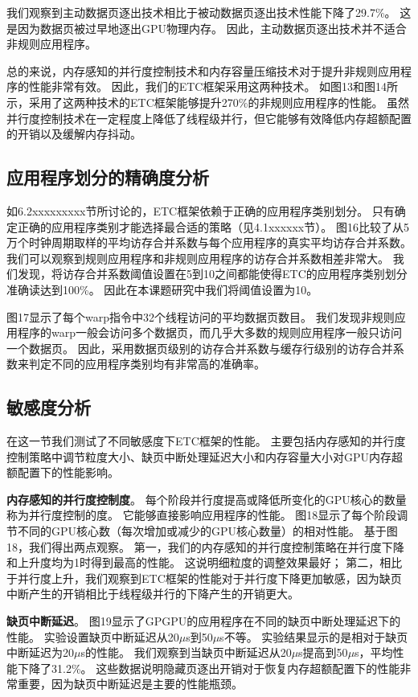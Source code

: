 我们观察到主动数据页逐出技术相比于被动数据页逐出技术性能下降了29.7\%。
这是因为数据页被过早地逐出GPU物理内存。
因此，主动数据页逐出技术并不适合非规则应用程序。

总的来说，内存感知的并行度控制技术和内存容量压缩技术对于提升非规则应用程序的性能非常有效。
因此，我们的ETC框架采用这两种技术。
如图13和图14所示，采用了这两种技术的ETC框架能够提升270\%的非规则应用程序的性能。
虽然并行度控制技术在一定程度上降低了线程级并行，但它能够有效降低内存超额配置的开销以及缓解内存抖动。

\subsection{应用程序划分的精确度分析}
如6.2xxxxxxxxx节所讨论的，ETC框架依赖于正确的应用程序类别划分。
只有确定正确的应用程序类别才能选择最合适的策略（见4.1xxxxxx节）。
图16比较了从5万个时钟周期取样的平均访存合并系数与每个应用程序的真实平均访存合并系数。
我们可以观察到规则应用程序和非规则应用程序的访存合并系数相差非常大。
我们发现，将访存合并系数阈值设置在5到10之间都能使得ETC的应用程序类别划分准确读达到100\%。
因此在本课题研究中我们将阈值设置为10。

图17显示了每个warp指令中32个线程访问的平均数据页数目。
我们发现非规则应用程序的warp一般会访问多个数据页，而几乎大多数的规则应用程序一般只访问一个数据页。
因此，采用数据页级别的访存合并系数与缓存行级别的访存合并系数来判定不同的应用程序类别均有非常高的准确率。

\subsection{敏感度分析}
在这一节我们测试了不同敏感度下ETC框架的性能。
主要包括内存感知的并行度控制策略中调节粒度大小、缺页中断处理延迟大小和内存容量大小对GPU内存超额配置下的性能影响。

\textbf{内存感知的并行度控制度}。
每个阶段并行度提高或降低所变化的GPU核心的数量称为并行度控制的度。
它能够直接影响应用程序的性能。
图18显示了每个阶段调节不同的GPU核心数（每次增加或减少的GPU核心数量）的相对性能。
基于图18，我们得出两点观察。
第一，我们的内存感知的并行度控制策略在并行度下降和上升度均为1时得到最高的性能。
这说明细粒度的调整效果最好；
第二，相比于并行度上升，我们观察到ETC框架的性能对于并行度下降更加敏感，因为缺页中断产生的开销相比于线程级并行的下降产生的开销更大。

\textbf{缺页中断延迟}。
图19显示了GPGPU的应用程序在不同的缺页中断处理延迟下的性能。
实验设置缺页中断延迟从20$\mu$s到50$\mu$s不等。
实验结果显示的是相对于缺页中断延迟为20$\mu$s的性能。
我们观察到当缺页中断延迟从20$\mu$s提高到50$\mu$s，平均性能下降了31.2\%。
这些数据说明隐藏页逐出开销对于恢复内存超额配置下的性能非常重要，因为缺页中断延迟是主要的性能瓶颈。

